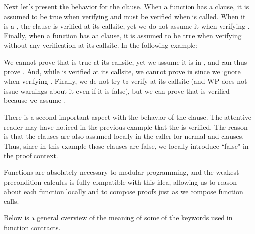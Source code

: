 Next let's present the behavior for the  clause. When a
function  has a  clause, it is assumed to be
true when verifying  and must be verified when  is
called. When it is a , the clause is verified at
its callsite, yet we do not assume it when verifying . Finally, when
a function  has an  clause, it is
assumed to be true when verifying  without any verification 
at its callsite. In the following example:



We cannot prove that  is true at its callsite, yet we
assume it is in
, and can thus prove . And, while
 is verified at its callsite, we cannot prove  in
 since we ignore  when verifying .
Finally, we do not try to verify  at its callsite (and WP does not
issue warnings about it even if it is false), but we can prove that  is
verified because we assume .


There is a second important aspect with the behavior of the 
clause. The attentive reader may have noticed in the previous example that the
 is verified. The reason is that the
 clauses are also assumed locally in the caller for normal
and   clauses. Thus, since in this
example those  clauses are false, we locally introduce
``false" in the proof context.




Functions are absolutely necessary to modular programming, and the weakest
precondition calculus is fully compatible with this idea, allowing us to reason
about each function locally and to compose proofs just as we compose function
calls.


Below is a general overview of the meaning of some of the keywords used
in function contracts.


